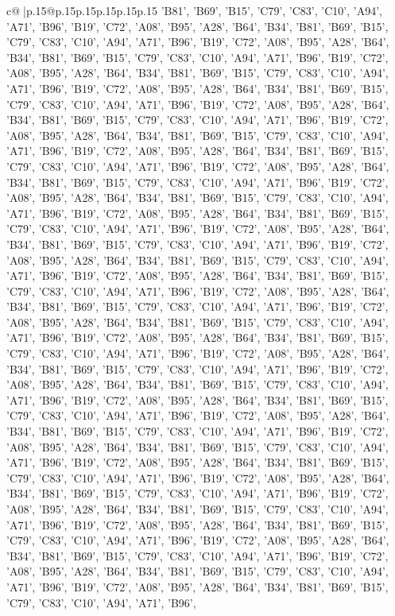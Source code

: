 \documentclass{article}
\begin{document}
{\begin{supertabular}{c@{$\;$}|p{.15\linewidth}@{}p{.15\linewidth}p{.15\linewidth}p{.15\linewidth}p{.15\linewidth}p{.15\linewidth}}
{{{'B81', 'B69', 'B15', 'C79', 'C83', 'C10', 'A94', 'A71', 'B96', 'B19', 'C72', 'A08', 'B95', 'A28', 'B64', 'B34', 'B81', 'B69', 'B15', 'C79', 'C83', 'C10', 'A94', 'A71', 'B96', 'B19', 'C72', 'A08', 'B95', 'A28', 'B64', 'B34', 'B81', 'B69', 'B15', 'C79', 'C83', 'C10', 'A94', 'A71', 'B96', 'B19', 'C72', 'A08', 'B95', 'A28', 'B64', 'B34', 'B81', 'B69', 'B15', 'C79', 'C83', 'C10', 'A94', 'A71', 'B96', 'B19', 'C72', 'A08', 'B95', 'A28', 'B64', 'B34', 'B81', 'B69', 'B15', 'C79', 'C83', 'C10', 'A94', 'A71', 'B96', 'B19', 'C72', 'A08', 'B95', 'A28', 'B64', 'B34', 'B81', 'B69', 'B15', 'C79', 'C83', 'C10', 'A94', 'A71', 'B96', 'B19', 'C72', 'A08', 'B95', 'A28', 'B64', 'B34', 'B81', 'B69', 'B15', 'C79', 'C83', 'C10', 'A94', 'A71', 'B96', 'B19', 'C72', 'A08', 'B95', 'A28', 'B64', 'B34', 'B81', 'B69', 'B15', 'C79', 'C83', 'C10', 'A94', 'A71', 'B96', 'B19', 'C72', 'A08', 'B95', 'A28', 'B64', 'B34', 'B81', 'B69', 'B15', 'C79', 'C83', 'C10', 'A94', 'A71', 'B96', 'B19', 'C72', 'A08', 'B95', 'A28', 'B64', 'B34', 'B81', 'B69', 'B15', 'C79', 'C83', 'C10', 'A94', 'A71', 'B96', 'B19', 'C72', 'A08', 'B95', 'A28', 'B64', 'B34', 'B81', 'B69', 'B15', 'C79', 'C83', 'C10', 'A94', 'A71', 'B96', 'B19', 'C72', 'A08', 'B95', 'A28', 'B64', 'B34', 'B81', 'B69', 'B15', 'C79', 'C83', 'C10', 'A94', 'A71', 'B96', 'B19', 'C72', 'A08', 'B95', 'A28', 'B64', 'B34', 'B81', 'B69', 'B15', 'C79', 'C83', 'C10', 'A94', 'A71', 'B96', 'B19', 'C72', 'A08', 'B95', 'A28', 'B64', 'B34', 'B81', 'B69', 'B15', 'C79', 'C83', 'C10', 'A94', 'A71', 'B96', 'B19', 'C72', 'A08', 'B95', 'A28', 'B64', 'B34', 'B81', 'B69', 'B15', 'C79', 'C83', 'C10', 'A94', 'A71', 'B96', 'B19', 'C72', 'A08', 'B95', 'A28', 'B64', 'B34', 'B81', 'B69', 'B15', 'C79', 'C83', 'C10', 'A94', 'A71', 'B96', 'B19', 'C72', 'A08', 'B95', 'A28', 'B64', 'B34', 'B81', 'B69', 'B15', 'C79', 'C83', 'C10', 'A94', 'A71', 'B96', 'B19', 'C72', 'A08', 'B95', 'A28', 'B64', 'B34', 'B81', 'B69', 'B15', 'C79', 'C83', 'C10', 'A94', 'A71', 'B96', 'B19', 'C72', 'A08', 'B95', 'A28', 'B64', 'B34', 'B81', 'B69', 'B15', 'C79', 'C83', 'C10', 'A94', 'A71', 'B96', 'B19', 'C72', 'A08', 'B95', 'A28', 'B64', 'B34', 'B81', 'B69', 'B15', 'C79', 'C83', 'C10', 'A94', 'A71', 'B96', 'B19', 'C72', 'A08', 'B95', 'A28', 'B64', 'B34', 'B81', 'B69', 'B15', 'C79', 'C83', 'C10', 'A94', 'A71', 'B96', 'B19', 'C72', 'A08', 'B95', 'A28', 'B64', 'B34', 'B81', 'B69', 'B15', 'C79', 'C83', 'C10', 'A94', 'A71', 'B96', 'B19', 'C72', 'A08', 'B95', 'A28', 'B64', 'B34', 'B81', 'B69', 'B15', 'C79', 'C83', 'C10', 'A94', 'A71', 'B96', 'B19', 'C72', 'A08', 'B95', 'A28', 'B64', 'B34', 'B81', 'B69', 'B15', 'C79', 'C83', 'C10', 'A94', 'A71', 'B96', 'B19', 'C72', 'A08', 'B95', 'A28', 'B64', 'B34', 'B81', 'B69', 'B15', 'C79', 'C83', 'C10', 'A94', 'A71', 'B96', 'B19', 'C72', 'A08', 'B95', 'A28', 'B64', 'B34', 'B81', 'B69', 'B15', 'C79', 'C83', 'C10', 'A94', 'A71', 'B96', 'B19', 'C72', 'A08', 'B95', 'A28', 'B64', 'B34', 'B81', 'B69', 'B15', 'C79', 'C83', 'C10', 'A94', 'A71', 'B96', 'B19', 'C72', 'A08', 'B95', 'A28', 'B64', 'B34', 'B81', 'B69', 'B15', 'C79', 'C83', 'C10', 'A94', 'A71', 'B96', 'B19', 'C72', 'A08', 'B95', 'A28', 'B64', 'B34', 'B81', 'B69', 'B15', 'C79', 'C83', 'C10', 'A94', 'A71', 'B96', }}}
\end{supertabular}}
\end{document}
